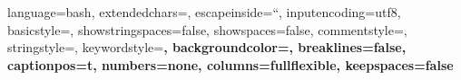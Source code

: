 
{
    language=bash,
    extendedchars=\true,
    escapeinside=``,
    inputencoding={utf8},
    basicstyle=\fontsize{10.3}{12.36}\ttfamily,
    showstringspaces=false,
    showspaces=false,
    commentstyle=\color{Turquoise},
    stringstyle=\color{Red},
    keywordstyle=\color{BlueViolet}\bfseries,
    backgroundcolor=\color{ShinyGray},
    breaklines=false,
    captionpos=t,
    numbers=none,
    columns=fullflexible,
    keepspaces=false
}
